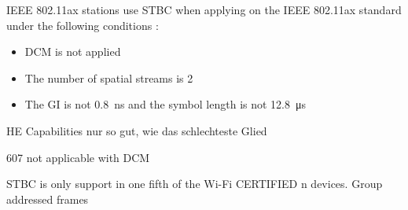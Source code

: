 IEEE 802.11ax stations use \ac{STBC} when applying on the IEEE 802.11ax standard under the following conditions \cite{standard_ieee_2021}:
\begin{itemize}
	\item DCM is not applied
	\item The number of spatial streams is \num{2}
	\item The \ac{GI} is not \SI{0.8}{\nano\second} and the symbol length is not \SI{12.8}{\micro\second}
\end{itemize}

HE Capabilities nur so gut, wie das schlechteste Glied

\cite{standard_ieee_2021} 607 not applicable with DCM

\cite{MAtthew gast 11n} \ac{STBC} is only support in one fifth of the Wi-Fi CERTIFIED n devices.
Group addressed frames
